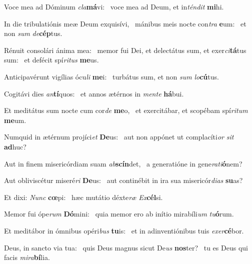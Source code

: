 \item Voce mea ad Dóminum \textit{cla}\textbf{má}vi:~\psstar{} voce mea ad Deum, et in\textit{téndit} \textbf{mi}hi.

\item In die tribulatiónis meæ Deum exquisívi,~\pscross{} mánibus meis nocte con\textit{tra} \textbf{e}um:~\psstar{} et non \textit{sum} \textit{de}\textbf{cép}tus.

\item Rénuit consolári ánima mea:~\pscross{} memor fui Dei, et delectátus sum, et exer\textit{ci}\textbf{tá}tus sum:~\psstar{} et defécit spí\textit{ritus} \textbf{me}us.

\item Anticipavérunt vigílias ócu\textit{li} \textbf{me}i:~\psstar{} turbátus sum, et non \textit{sum} \textit{lo}\textbf{cú}tus.

\item Cogitávi dies \textit{an}\textbf{tí}quos:~\psstar{} et annos ætérnos in \textit{mente} \textbf{há}bui.

\item Et meditátus sum nocte cum cor\textit{de} \textbf{me}o,~\psstar{} et exercitábar, et scopébam spí\textit{ritum} \textbf{me}um.

\item Numquid in ætérnum projíci\textit{et} \textbf{De}us:~\psstar{} aut non appónet ut complacíti\textit{or} \textit{sit} \textbf{ad}huc?

\item Aut in finem misericórdiam suam \textit{ab}\textbf{scín}det,~\psstar{} a generatióne in gene\textit{rati}\textbf{ó}nem?

\item Aut obliviscétur miseré\textit{ri} \textbf{De}us:~\psstar{} aut continébit in ira sua misericór\textit{dias} \textbf{su}as?

\item Et dixi: \textit{Nunc} \textbf{cœ}pi:~\psstar{} hæc mutátio déxte\textit{ræ} \textit{Ex}\textbf{cél}si.

\item Memor fui ópe\textit{rum} \textbf{Dó}mini:~\psstar{} quia memor ero ab inítio mirabíli\textit{um} \textit{tu}\textbf{ó}rum.

\item Et meditábor in ómnibus opéri\textit{bus} \textbf{tu}is:~\psstar{} et in adinventiónibus tuis \textit{exer}\textbf{cé}bor.

\item Deus, in sancto via tua:~\pscross{} quis Deus magnus sicut De\textit{us} \textbf{nos}ter?~\psstar{} tu es Deus qui facis \textit{mira}\textbf{bí}lia.


